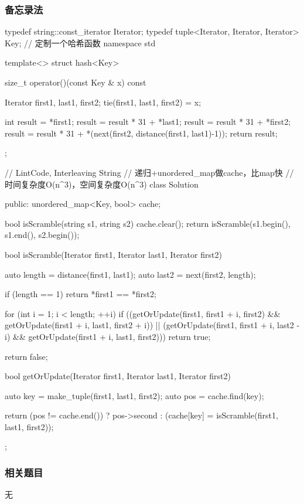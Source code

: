 \subsubsection{备忘录法}
\begin{Code}
typedef string::const_iterator Iterator;
typedef tuple<Iterator, Iterator, Iterator> Key;
// 定制一个哈希函数
namespace std {
template<> struct hash<Key> {
    size_t operator()(const Key & x) const {
        Iterator first1, last1, first2;
        tie(first1, last1, first2) = x;

        int result = *first1;
        result = result * 31 + *last1;
        result = result * 31 + *first2;
        result = result * 31 + *(next(first2, distance(first1, last1)-1));
        return result;
    }
};
}

// LintCode, Interleaving String
// 递归+unordered_map做cache，比map快
// 时间复杂度O(n^3)，空间复杂度O(n^3)
class Solution {
public:
    unordered_map<Key, bool> cache;

    bool isScramble(string s1, string s2) {
        cache.clear();
        return isScramble(s1.begin(), s1.end(), s2.begin());
    }

    bool isScramble(Iterator first1, Iterator last1, Iterator first2) {
        auto length = distance(first1, last1);
        auto last2 = next(first2, length);

        if (length == 1)
            return *first1 == *first2;

        for (int i = 1; i < length; ++i)
            if ((getOrUpdate(first1, first1 + i, first2)
                    && getOrUpdate(first1 + i, last1, first2 + i))
                    || (getOrUpdate(first1, first1 + i, last2 - i)
                            && getOrUpdate(first1 + i, last1, first2)))
                return true;

        return false;
    }

    bool getOrUpdate(Iterator first1, Iterator last1, Iterator first2) {
        auto key = make_tuple(first1, last1, first2);
        auto pos = cache.find(key);

        return (pos != cache.end()) ?
                pos->second : (cache[key] = isScramble(first1, last1, first2));
    }
};
\end{Code}


\subsubsection{相关题目}
\begindot
\item 无
\myenddot


